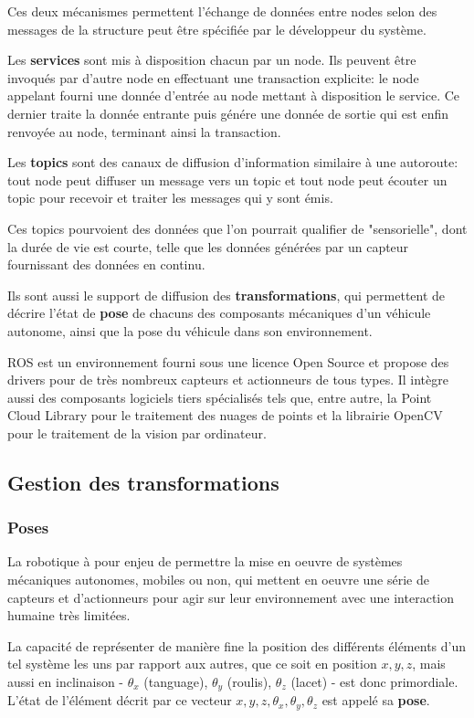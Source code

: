 \documentclass[12pt,a4paper]{report}
\begin{document}
	\para Ces deux mécanismes permettent l'échange de données entre nodes selon des messages de la structure peut être spécifiée par le développeur du système.
	
	\para Les \textbf{services} sont mis à disposition chacun par un node. Ils peuvent être invoqués par d'autre node en effectuant une transaction explicite: le node appelant fourni une donnée d'entrée au node mettant à disposition le service. Ce dernier traite la donnée entrante puis génére une donnée de sortie qui est enfin renvoyée au node, terminant ainsi la transaction.
	
	\para Les \textbf{topics} sont des canaux de diffusion d'information similaire à une autoroute: tout node peut diffuser un message vers un topic et tout node peut écouter un topic pour recevoir et traiter les messages qui y sont émis.
	
	\para Ces topics pourvoient des données que l'on pourrait qualifier de "sensorielle", dont la durée de vie est courte, telle que les données générées par un capteur fournissant des données en continu. 
	
	\para Ils sont aussi le support de diffusion des \textbf{transformations}, qui permettent de décrire l'état de \textbf{pose} de chacuns des composants mécaniques d'un véhicule autonome, ainsi que la pose du véhicule dans son environnement.
	
	\para ROS est un environnement fourni sous une licence Open Source et propose des drivers pour de très nombreux capteurs et actionneurs de tous types. Il intègre aussi des composants logiciels tiers spécialisés tels que, entre autre, la Point Cloud Library pour le traitement des nuages de points et la librairie OpenCV pour le traitement de la vision par ordinateur.
	

	\subsection{Gestion des transformations}
		
			\subsubsection{Poses}
		
		La robotique à pour enjeu de permettre la mise en oeuvre de systèmes mécaniques autonomes, mobiles ou non, qui mettent en oeuvre une série de capteurs et d'actionneurs pour agir sur leur environnement avec une interaction humaine très limitées.
		
		\para La capacité de représenter de manière fine la position des différents éléments d'un tel système les uns par rapport aux autres, que ce soit en position $x,y,z$, mais aussi en inclinaison - $\theta_x$ (tanguage), $\theta_y$ (roulis), $\theta_z$ (lacet) - est donc primordiale. L'état de l'élément décrit par ce vecteur $x,y,z, \theta_x, \theta_y, \theta_z$ est appelé sa \textbf{pose}.
		
\end{document}
